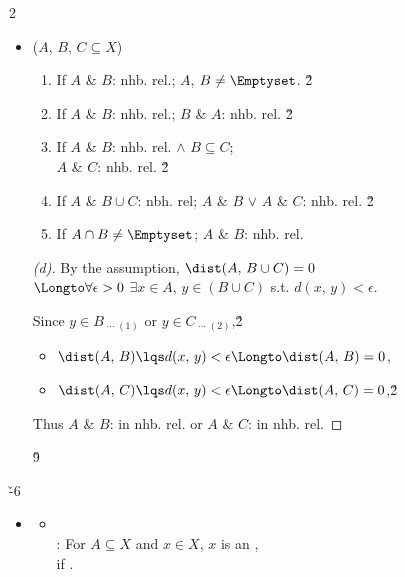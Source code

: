 \documentclass[dvipdfmx,a4paper,titlepage,9pt]{jsarticle}
\begin{document}
\begin{multicols*}{2}
\begin{itemize}[label=-]
\vfill\null\columnbreak

\item{} ($A$, $B$, $C\subseteq X$)
\begin{enumerate}[label=(\alph*)]
\item If $A$ \& $B$: nhb. \!rel.; $A$, $B\neq\Emptyset$. \v2
\item If $A$ \& $B$: nhb. \!rel.; $B$ \& $A$: nhb. \!rel. \v2
\item If $A$ \& $B$: nhb. \!rel. $\wedge$ $B\subseteq C$; \\
      $A$ \& $C$: nhb. \!rel. \v2
\item If $A$ \& $B\cup C$: nbh. \!rel; $A$ \& $B$ $\vee$ $A$ \& $C$: nhb. \!rel. \v2
\item If $A\cap B\neq\Emptyset$; $A$ \& $B$: nhb. \!rel.
\end{enumerate}
\begin{pfbox}
\begin{proof}[(d)]
By the assumption, $\dist(A,\,B\cup C)=0$\\
$\Longto\forall\epsilon>0$ $\exists x\in A$, $y\in (B\cup C)$ s.t. $d(x,\,y)<\epsilon$.

Since $y\in B_{\;\cdots\;(1)}$ or $y\in C_{\;\cdots\;(2)}$,\v2
\begin{itemize}
\setlength{\leftskip}{-5pt}
\item[$(1)$] $\dist(A,\,B)\lqs d(x,\,y)<\epsilon\Longto\dist(A,\,B)=0$,
\item[$(2)$] $\dist(A,\,C)\lqs d(x,\,y)<\epsilon\Longto\dist(A,\,C)=0$,\v2
\end{itemize}
Thus $A$ \& $B$: in nhb. rel. or $A$ \& $C$: in nhb. rel.
\end{proof}
\end{pfbox}\v9
\end{itemize}

\v{-6}
\begin{itemize}[label=-]
\item{} 
\begin{itemize}[label={\Cdot}]
\setlength{\leftskip}{-5pt}
\item{} \\
: For $A\subseteq X$ and $x\in X$, $x$ is an ,\\
\;\;if . \\


\end{itemize}
\end{itemize}
\end{multicols*}
\end{document}
